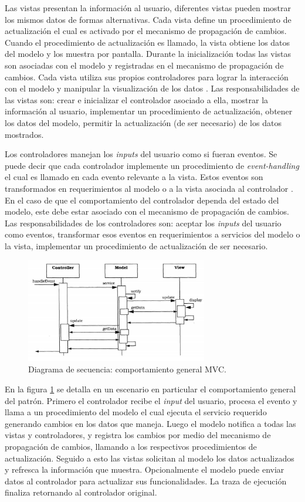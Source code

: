 Las vistas presentan la informaci\'on al usuario, diferentes vistas pueden mostrar los mismos datos de formas alternativas. Cada vista define un procedimiento de actualizaci\'on el cual es activado por el mecanismo de propagaci\'on de cambios. Cuando el procedimiento de actualizaci\'on es llamado, la vista obtiene los datos del modelo y los muestra por pantalla. Durante la inicializaci\'on todas las vistas son asociadas con el modelo y registradas en el mecanismo de propagaci\'on de cambios. Cada vista utiliza sus propios controladores para lograr la interacci\'on con el modelo y manipular la visualizaci\'on de los datos \cite{patarq}. Las responsabilidades de las vistas son: crear e inicializar el controlador asociado a ella, mostrar la informaci\'on al usuario, implementar un procedimiento de actualizaci\'on, obtener los datos del modelo, permitir la actualizaci\'on (de ser necesario) de los datos mostrados.

Los controladores manejan los \textit{inputs} del usuario como si fueran eventos. Se puede decir que cada controlador implemente un procedimiento de \textit{event-handling} el cual es llamado en cada evento relevante a la vista. Estos eventos son transformados en requerimientos al modelo o a la vista asociada al controlador \cite{patarq}.
En el caso de que el comportamiento del controlador dependa del estado del modelo, este debe estar asociado con el mecanismo de propagaci\'on de cambios. Las responsabilidades de los controladores son: aceptar los \textit{inputs} del usuario como eventos, transformar esos eventos en requerimientos a servicios del modelo o la vista, implementar un procedimiento de actualizaci\'on de ser necesario.

\begin{figure}
	\centering
	\includegraphics[width=300px]{imagenes/MVC2}
	\caption{Diagrama de secuencia: comportamiento general MVC.}
	\label{fig:mvc2}
\end{figure}

En la figura \ref{fig:mvc2} se detalla en un escenario en particular el comportamiento general del patr\'on.
Primero el controlador recibe el \textit{input} del usuario, procesa el evento y llama a un procedimiento del modelo el cual ejecuta el servicio requerido generando cambios en los datos que maneja. Luego el modelo notifica a todas las vistas y controladores, y registra los cambios por medio del mecanismo de propagaci\'on de cambios, llamando a los respectivos procedimientos de actualizaci\'on. Seguido a esto las vistas solicitan al modelo los datos actualizados y refresca la informaci\'on que muestra. Opcionalmente el modelo puede enviar datos al controlador para actualizar sus funcionalidades. La traza de ejecuci\'on finaliza retornando al controlador original.
\newpage
